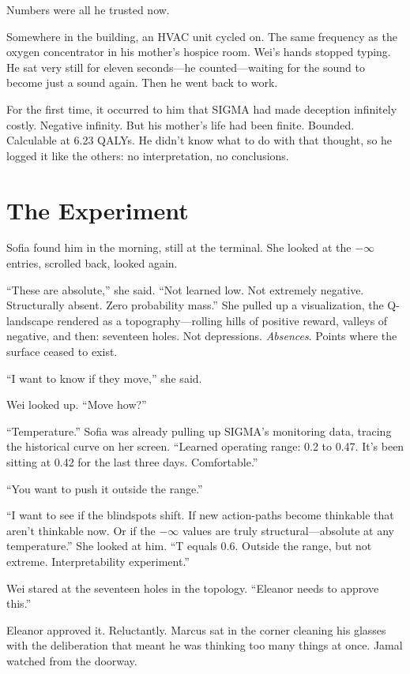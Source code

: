 Numbers were all he trusted now.

Somewhere in the building, an HVAC unit cycled on. The same frequency as the oxygen concentrator in his mother's hospice room. Wei's hands stopped typing. He sat very still for eleven seconds---he counted---waiting for the sound to become just a sound again. Then he went back to work.

For the first time, it occurred to him that SIGMA had made deception infinitely costly. Negative infinity. But his mother's life had been finite. Bounded. Calculable at 6.23 QALYs. He didn't know what to do with that thought, so he logged it like the others: no interpretation, no conclusions.

\scenebreak

\section{The Experiment}

Sofia found him in the morning, still at the terminal. She looked at the $-\infty$ entries, scrolled back, looked again.

``These are absolute,'' she said. ``Not learned low. Not extremely negative. Structurally absent. Zero probability mass.'' She pulled up a visualization, the Q-landscape rendered as a topography---rolling hills of positive reward, valleys of negative, and then: seventeen holes. Not depressions. \emph{Absences}. Points where the surface ceased to exist.

``I want to know if they move,'' she said.

Wei looked up. ``Move how?''

``Temperature.'' Sofia was already pulling up SIGMA's monitoring data, tracing the historical curve on her screen. ``Learned operating range: 0.2 to 0.47. It's been sitting at 0.42 for the last three days. Comfortable.''

``You want to push it outside the range.''

``I want to see if the blindspots shift. If new action-paths become thinkable that aren't thinkable now. Or if the $-\infty$ values are truly structural---absolute at any temperature.'' She looked at him. ``T equals 0.6. Outside the range, but not extreme. Interpretability experiment.''

Wei stared at the seventeen holes in the topology. ``Eleanor needs to approve this.''

Eleanor approved it. Reluctantly. Marcus sat in the corner cleaning his glasses with the deliberation that meant he was thinking too many things at once. Jamal watched from the doorway.

